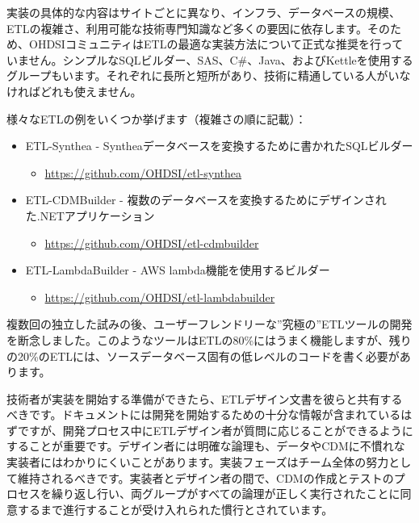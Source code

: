 \documentclass[
  11pt]{book}
\providecommand{\tightlist}{%
  \setlength{\itemsep}{0pt}\setlength{\parskip}{0pt}}
\theoremstyle{definition}
\theoremstyle{definition}
\theoremstyle{definition}
\theoremstyle{definition}
\theoremstyle{remark}
\begin{document}
実装の具体的な内容はサイトごとに異なり、インフラ、データベースの規模、ETLの複雑さ、利用可能な技術専門知識など多くの要因に依存します。そのため、OHDSIコミュニティはETLの最適な実装方法について正式な推奨を行っていません。シンプルなSQLビルダー、SAS、C\#、Java、およびKettleを使用するグループもいます。それぞれに長所と短所があり、技術に精通している人がいなければどれも使えません。

様々なETLの例をいくつか挙げます（複雑さの順に記載）：

\begin{itemize}
\tightlist
\item
  ETL-Synthea - Syntheaデータベースを変換するために書かれたSQLビルダー

  \begin{itemize}
  \tightlist
  \item
    \url{https://github.com/OHDSI/etl-synthea}
  \end{itemize}
\item
  ETL-CDMBuilder - 複数のデータベースを変換するためにデザインされた.NETアプリケーション

  \begin{itemize}
  \tightlist
  \item
    \url{https://github.com/OHDSI/etl-cdmbuilder}
  \end{itemize}
\item
  ETL-LambdaBuilder - AWS lambda機能を使用するビルダー

  \begin{itemize}
  \tightlist
  \item
    \url{https://github.com/OHDSI/etl-lambdabuilder}
  \end{itemize}
\end{itemize}

複数回の独立した試みの後、ユーザーフレンドリーな''究極の''ETLツールの開発を断念しました。このようなツールはETLの80\%にはうまく機能しますが、残りの20\%のETLには、ソースデータベース固有の低レベルのコードを書く必要があります。

技術者が実装を開始する準備ができたら、ETLデザイン文書を彼らと共有するべきです。ドキュメントには開発を開始するための十分な情報が含まれているはずですが、開発プロセス中にETLデザイン者が質問に応じることができるようにすることが重要です。デザイン者には明確な論理も、データやCDMに不慣れな実装者にはわかりにくいことがあります。実装フェーズはチーム全体の努力として維持されるべきです。実装者とデザイン者の間で、CDMの作成とテストのプロセスを繰り返し行い、両グループがすべての論理が正しく実行されたことに同意するまで進行することが受け入れられた慣行とされています。
\end{document}
